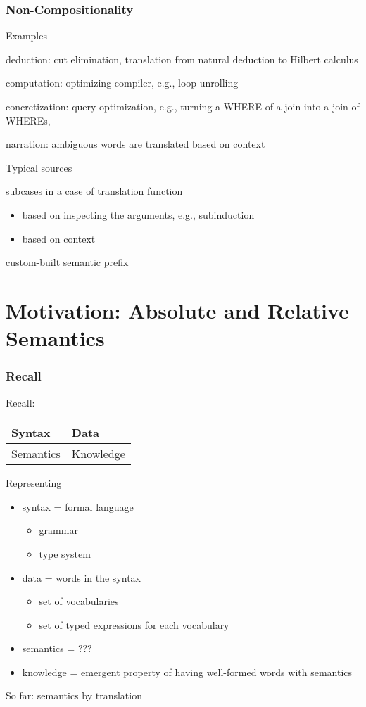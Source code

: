 \begin{frame}\frametitle{Non-Compositionality}
\begin{blockitems}{Examples}
 \item deduction: cut elimination, translation from natural deduction to Hilbert calculus
 \item computation: optimizing compiler, e.g., loop unrolling
 \item concretization: query optimization, e.g., turning a WHERE of a join into a join of WHEREs,
 \item narration: ambiguous words are translated based on context
\end{blockitems}

\begin{blockitems}{Typical sources}
 \item subcases in a case of translation function
  \begin{itemize}
  \item based on inspecting the arguments, e.g., subinduction
  \item based on context
  \end{itemize}
 \item custom-built semantic prefix
\end{blockitems}
\end{frame}

\section{Motivation: Absolute and Relative Semantics}

\begin{frame}\frametitle{Recall}
Recall:

\begin{center}
\begin{tabular}{l|l}
Syntax & Data \\
\hline
Semantics & Knowledge
\end{tabular}
\end{center}

Representing
\begin{itemize}
\item syntax = formal language
\begin{itemize}
\item grammar  
\item type system 
\end{itemize}
\item data = words in the syntax
\begin{itemize}
\item set of vocabularies
\item set of typed expressions for each vocabulary
\end{itemize}
\item semantics = \alert{???}
\item knowledge = emergent property of having well-formed words with semantics
\end{itemize}

So far: semantics by translation
\end{frame}

